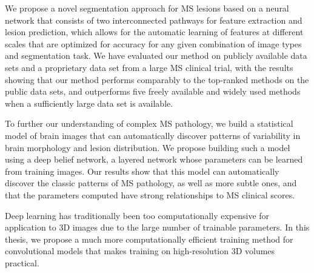 
We propose a novel segmentation approach for MS lesions based on a neural
network that consists of two interconnected pathways for feature extraction and
lesion prediction, which allows for the automatic learning of features at
different scales that are optimized for accuracy for any given combination of
image types and segmentation task. We have evaluated our method on publicly
available data sets and a proprietary data set from a large MS clinical trial,
with the results showing that our method performs comparably to the top-ranked
methods on the public data sets, and outperforms five freely available and
widely used methods when a sufficiently large data set is available.


To further our understanding of complex MS pathology, we build a statistical
model of brain images that can automatically discover patterns of variability in
brain morphology and lesion distribution. We propose building such a model using
a deep belief network, a layered network whose parameters can be learned
from training images.
Our results show that this model can automatically discover the classic patterns
of MS pathology, as well as more subtle ones, and that the parameters computed
have strong relationships to MS clinical scores.

Deep learning has traditionally been too computationally expensive for
application to 3D images due to the large number of trainable parameters. In
this thesis, we propose a much more computationally efficient training method
for convolutional models that makes training on high-resolution 3D volumes
practical.

